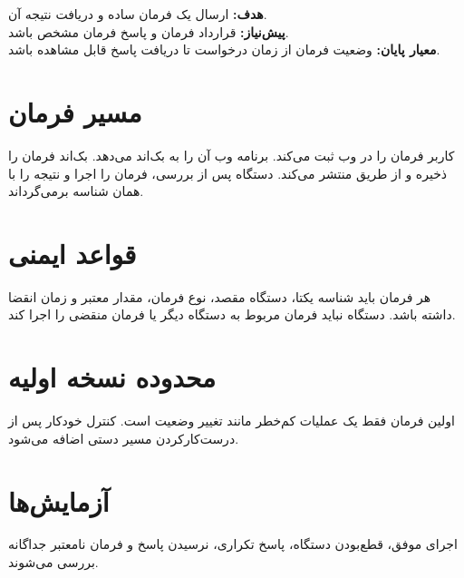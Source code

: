 \begin{phasebox}
\textbf{هدف:} ارسال یک فرمان ساده و دریافت نتیجه آن.\\
\textbf{پیش‌نیاز:} قرارداد فرمان و پاسخ فرمان مشخص باشد.\\
\textbf{معیار پایان:} وضعیت فرمان از زمان درخواست تا دریافت پاسخ قابل مشاهده باشد.
\end{phasebox}

\section{مسیر فرمان}
کاربر فرمان را در وب ثبت می‌کند. برنامه وب آن را به بک‌اند می‌دهد. بک‌اند فرمان را ذخیره و از طریق
منتشر می‌کند. دستگاه پس از بررسی، فرمان را اجرا و نتیجه را با همان شناسه برمی‌گرداند.

\section{قواعد ایمنی}
هر فرمان باید شناسه یکتا، دستگاه مقصد، نوع فرمان، مقدار معتبر و زمان انقضا داشته باشد. دستگاه نباید فرمان مربوط به دستگاه دیگر یا فرمان منقضی را اجرا کند.

\section{محدوده نسخه اولیه}
اولین فرمان فقط یک عملیات کم‌خطر مانند تغییر وضعیت
است. کنترل خودکار پس از درست‌کارکردن مسیر دستی اضافه می‌شود.

\section{آزمایش‌ها}
اجرای موفق، قطع‌بودن دستگاه، پاسخ تکراری، نرسیدن پاسخ و فرمان نامعتبر جداگانه بررسی می‌شوند.
